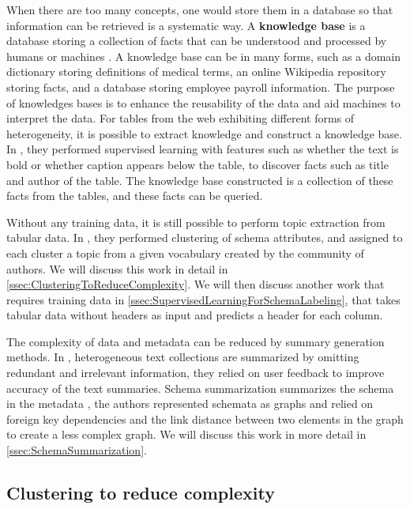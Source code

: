 When there are too many concepts, one would store them in a database so that information can be retrieved is a systematic way. A \textbf{\gls{knowledge base}} is a database storing a collection of facts that can be understood and processed by humans or machines \cite{Zhang2018Managing}. A knowledge base can be in many forms, such as a domain dictionary storing definitions of medical terms, an online Wikipedia repository storing facts, and a database storing employee payroll information. The purpose of knowledges bases is to enhance the reusability of the data and aid machines to interpret the data. For tables from the web exhibiting different forms of heterogeneity, it is possible to extract knowledge and construct a knowledge base. In \cite{10.1145/3183713.3183729}, they performed supervised learning with features such as whether the text is bold or whether caption appears below the table, to discover facts such as title and author of the table. The knowledge base constructed is a collection of these facts from the tables, and these facts can be queried.

Without any training data, it is still possible to perform topic extraction from tabular data. In \cite{Smith2011Unity}, they performed clustering of schema attributes, and assigned to each cluster a topic from a given vocabulary created by the community of authors. We will discuss this work in detail in \autoref{ssec:ClusteringToReduceComplexity}. We will then discuss another work that requires training data \cite{10.1145/3184558.3191601} in \autoref{ssec:SupervisedLearningForSchemaLabeling}, that takes tabular data without headers as input and predicts a header for each column.

The complexity of data and metadata can be reduced by summary generation methods. In \cite{Benjamin2019Interactive}, heterogeneous text collections are summarized by omitting redundant and irrelevant information, they relied on user feedback to improve accuracy of the text summaries. Schema summarization summarizes the schema in the metadata \cite{Yu2006Schema}, the authors represented schemata as graphs and relied on foreign key dependencies and the link distance between two elements in the graph to create a less complex graph. We will discuss this work in more detail in \autoref{ssec:SchemaSummarization}.

\subsection{Clustering to reduce complexity}
\label{ssec:ClusteringToReduceComplexity}

